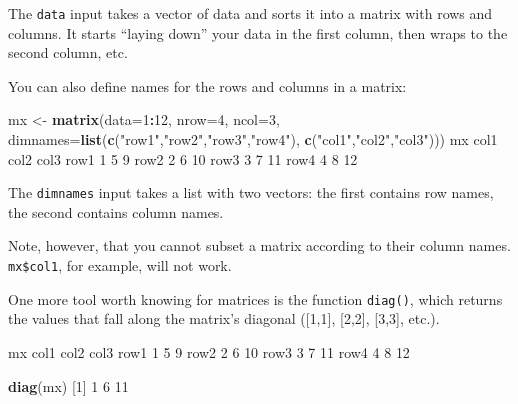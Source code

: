 \documentclass[
]{book}
\newenvironment{Shaded}{\begin{snugshade}}{\end{snugshade}}
\newcommand{\DataTypeTok}[1]{\textcolor[rgb]{0.13,0.29,0.53}{#1}}
\newcommand{\DecValTok}[1]{\textcolor[rgb]{0.00,0.00,0.81}{#1}}
\newcommand{\KeywordTok}[1]{\textcolor[rgb]{0.13,0.29,0.53}{\textbf{#1}}}
\newcommand{\NormalTok}[1]{#1}
\newcommand{\OperatorTok}[1]{\textcolor[rgb]{0.81,0.36,0.00}{\textbf{#1}}}
\newcommand{\StringTok}[1]{\textcolor[rgb]{0.31,0.60,0.02}{#1}}
\begin{document}
The \texttt{data} input takes a vector of data and sorts it into a matrix with rows and columns. It starts ``laying down'' your data in the first column, then wraps to the second column, etc.

You can also define names for the rows and columns in a matrix:

\begin{Shaded}
\begin{Highlighting}[]
\NormalTok{mx <-}\StringTok{ }\KeywordTok{matrix}\NormalTok{(}\DataTypeTok{data=}\DecValTok{1}\OperatorTok{:}\DecValTok{12}\NormalTok{, }
             \DataTypeTok{nrow=}\DecValTok{4}\NormalTok{,}
             \DataTypeTok{ncol=}\DecValTok{3}\NormalTok{,}
             \DataTypeTok{dimnames=}\KeywordTok{list}\NormalTok{(}\KeywordTok{c}\NormalTok{(}\StringTok{"row1"}\NormalTok{,}\StringTok{"row2"}\NormalTok{,}\StringTok{"row3"}\NormalTok{,}\StringTok{"row4"}\NormalTok{),}
                           \KeywordTok{c}\NormalTok{(}\StringTok{"col1"}\NormalTok{,}\StringTok{"col2"}\NormalTok{,}\StringTok{"col3"}\NormalTok{)))}
\NormalTok{mx}
\NormalTok{     col1 col2 col3}
\NormalTok{row1    }\DecValTok{1}    \DecValTok{5}    \DecValTok{9}
\NormalTok{row2    }\DecValTok{2}    \DecValTok{6}   \DecValTok{10}
\NormalTok{row3    }\DecValTok{3}    \DecValTok{7}   \DecValTok{11}
\NormalTok{row4    }\DecValTok{4}    \DecValTok{8}   \DecValTok{12}
\end{Highlighting}
\end{Shaded}

The \texttt{dimnames} input takes a list with two vectors: the first contains row names, the second contains column names.

Note, however, that you cannot subset a matrix according to their column names. \texttt{mx\$col1}, for example, will not work.

One more tool worth knowing for matrices is the function \texttt{diag()}, which returns the values that fall along the matrix's diagonal ({[}1,1{]}, {[}2,2{]}, {[}3,3{]}, etc.).

\begin{Shaded}
\begin{Highlighting}[]
\NormalTok{mx}
\NormalTok{     col1 col2 col3}
\NormalTok{row1    }\DecValTok{1}    \DecValTok{5}    \DecValTok{9}
\NormalTok{row2    }\DecValTok{2}    \DecValTok{6}   \DecValTok{10}
\NormalTok{row3    }\DecValTok{3}    \DecValTok{7}   \DecValTok{11}
\NormalTok{row4    }\DecValTok{4}    \DecValTok{8}   \DecValTok{12}

\KeywordTok{diag}\NormalTok{(mx)}
\NormalTok{[}\DecValTok{1}\NormalTok{]  }\DecValTok{1}  \DecValTok{6} \DecValTok{11}
\end{Highlighting}
\end{Shaded}
\end{document}
